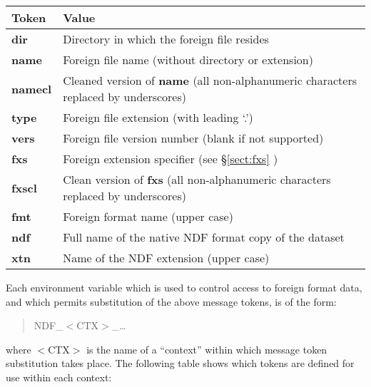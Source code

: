 \documentclass[11pt,twoside,nolof]{starlink}
\begin{document}
\begin{center}
\begin{tabular}{|l|l|}
\hline
\textbf{Token} & \textbf{Value}\\
\hline\hline
\textbf{dir}  & Directory in which the foreign file resides\\
\textbf{name} & Foreign file name (without directory or extension)\\
\textbf{namecl} & Cleaned version of \textbf{name} (all non-alphanumeric characters
replaced by underscores)\\
\textbf{type} & Foreign file extension (with leading `.')\\
\textbf{vers} & Foreign file version number (blank if not supported)\\
\textbf{fxs}  & Foreign extension specifier (see \S\ref{sect:fxs} )\\
\textbf{fxscl} & Clean version of \textbf{fxs} (all non-alphanumeric characters
replaced by underscores)\\
\textbf{fmt}  & Foreign format name (upper case)\\
\textbf{ndf}  & Full name of the native NDF format copy of the dataset\\
\textbf{xtn}  & Name of the NDF extension (upper case)\\
\hline
\end{tabular}
\end{center}

Each environment variable which is used to control access to foreign
format data, and which permits substitution of the above message
tokens, is of the form:

\begin{quote}
NDF\_$<$CTX$>$\_\ldots
\end{quote}

where $<$CTX$>$ is the name of a ``context'' within which message
token substitution takes place. The following table shows which tokens
are defined for use within each context:
\end{document}
